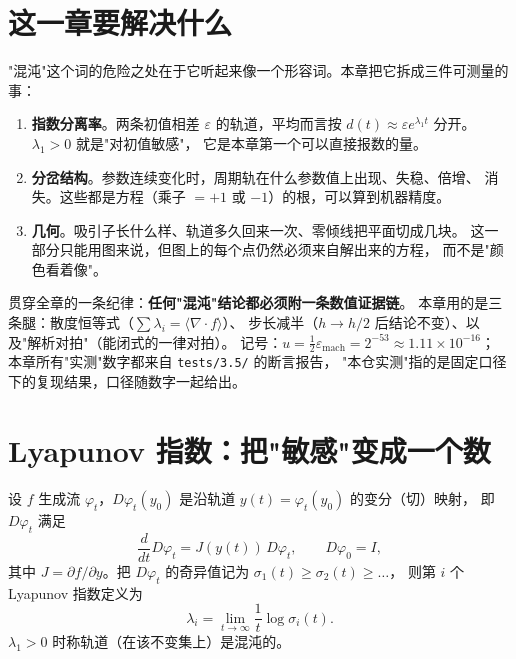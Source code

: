 

\section{这一章要解决什么}

"混沌"这个词的危险之处在于它听起来像一个形容词。本章把它拆成三件可测量的事：

\begin{enumerate}
  \item \textbf{指数分离率}。两条初值相差 $\varepsilon$ 的轨道，平均而言按
        $d(t)\approx\varepsilon e^{\lambda_1 t}$ 分开。$\lambda_1>0$ 就是"对初值敏感"，
        它是本章第一个可以直接报数的量。
  \item \textbf{分岔结构}。参数连续变化时，周期轨在什么参数值上出现、失稳、倍增、
        消失。这些都是方程（乘子 $=+1$ 或 $-1$）的根，可以算到机器精度。
  \item \textbf{几何}。吸引子长什么样、轨道多久回来一次、零倾线把平面切成几块。
        这一部分只能用图来说，但图上的每个点仍然必须来自解出来的方程，
        而不是"颜色看着像"。
\end{enumerate}

贯穿全章的一条纪律：\textbf{任何"混沌"结论都必须附一条数值证据链}。
本章用的是三条腿：散度恒等式（$\sum\lambda_i=\langle\nabla\!\cdot\!f\rangle$）、
步长减半（$h\to h/2$ 后结论不变）、以及"解析对拍"（能闭式的一律对拍）。
记号：$u=\tfrac12\varepsilon_{\text{mach}}=2^{-53}\approx1.11\times10^{-16}$；
本章所有"实测"数字都来自 \texttt{tests/3.5/} 的断言报告，
"本仓实测"指的是固定口径下的复现结果，口径随数字一起给出。

\section{Lyapunov 指数：把"敏感"变成一个数}

\begin{definition}[流的 Lyapunov 指数]
设 $f$ 生成流 $\varphi_t$，$D\varphi_t(y_0)$ 是沿轨道 $y(t)=\varphi_t(y_0)$ 的变分（切）映射，
即 $D\varphi_t$ 满足
\begin{equation}
  \frac{d}{dt}D\varphi_t=J(y(t))\,D\varphi_t,\qquad D\varphi_0=I ,
  \label{eq:variational}
\end{equation}
其中 $J=\partial f/\partial y$。把 $D\varphi_t$ 的奇异值记为 $\sigma_1(t)\ge\sigma_2(t)\ge\dots$，
则第 $i$ 个 Lyapunov 指数定义为
\begin{equation}
  \lambda_i=\lim_{t\to\infty}\frac1t\log\sigma_i(t).
  \label{eq:lyap}
\end{equation}
$\lambda_1>0$ 时称轨道（在该不变集上）是混沌的。
\end{definition}


